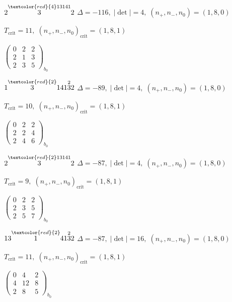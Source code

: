 \documentclass[10pt]{article}
\begin{document}
\smallskip

$2\overset{\textcolor{red}{4}13141}{3}2$ \quad $\Delta=-116,\; |\det|=4,\; (n_+,n_-,n_0)=(1,8,0)$

\hspace{1em}$T_{\text{crit}}=11,\; (n_+,n_-,n_0)_{\text{crit}}=(1,8,1)$

\hspace{2em}$\left(\begin{smallmatrix}0 & 2 & 2 \\ 2 & 1 & 3 \\ 2 & 3 & 5\end{smallmatrix}\right)_{\!b_0}$

$1\overset{\textcolor{red}{2}}{3}141\overset{2}{3}2$ \quad $\Delta=-89,\; |\det|=4,\; (n_+,n_-,n_0)=(1,8,0)$

\hspace{1em}$T_{\text{crit}}=10,\; (n_+,n_-,n_0)_{\text{crit}}=(1,8,1)$

\hspace{2em}$\left(\begin{smallmatrix}0 & 2 & 2 \\ 2 & 2 & 4 \\ 2 & 4 & 6\end{smallmatrix}\right)_{\!b_0}$

$2\overset{\textcolor{red}{2}13141}{3}2$ \quad $\Delta=-87,\; |\det|=4,\; (n_+,n_-,n_0)=(1,8,0)$

\hspace{1em}$T_{\text{crit}}=9,\; (n_+,n_-,n_0)_{\text{crit}}=(1,8,1)$

\hspace{2em}$\left(\begin{smallmatrix}0 & 2 & 2 \\ 2 & 3 & 5 \\ 2 & 5 & 7\end{smallmatrix}\right)_{\!b_0}$

$13\overset{\textcolor{red}{2}}{1}41\overset{2}{3}2$ \quad $\Delta=-87,\; |\det|=16,\; (n_+,n_-,n_0)=(1,8,0)$

\hspace{1em}$T_{\text{crit}}=11,\; (n_+,n_-,n_0)_{\text{crit}}=(1,8,1)$

\hspace{2em}$\left(\begin{smallmatrix}0 & 4 & 2 \\ 4 & 12 & 8 \\ 2 & 8 & 5\end{smallmatrix}\right)_{\!b_0}$
\end{document}
